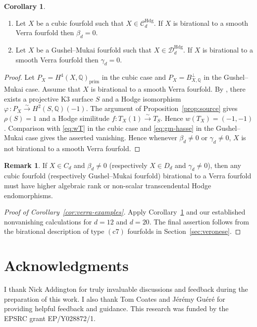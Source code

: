 \documentclass[10pt]{amsart}
\numberwithin{equation}{section}
\theoremstyle{definition}
\newtheorem{corollary}[theorem]{Corollary}
\newtheorem{remark}[theorem]{Remark}
\theoremstyle{plain}
\numberwithin{theorem}{section}
\newcommand{\Q}{\mathbb{Q}}
\begin{document}
\begin{corollary}\label{cor:verra} \ 
\begin{enumerate}
    \item Let $X$ be a cubic fourfold such that $X\in\mathcal C_d^{\mathrm{Hdg}}$. If $X$ is birational to a smooth Verra fourfold then $\beta_d = 0$.
    \item Let $X$ be a Gushel--Mukai fourfold such that $X\in\mathcal D_d^{\mathrm{Hdg}}$. If $X$ is birational to a smooth Verra fourfold then $\gamma_d = 0$.
\end{enumerate}
\end{corollary}
\begin{proof}
Let $P_X = H^4(X,\Q)_{\text{prim}}$ in the cubic case and $P_X = B_{X,\Q}^\perp$ in the Gushel--Mukai case. Assume that $X$ is birational to a smooth Verra fourfold. By \cite[Theorem~21]{benedetti2026quantumcohomologybirationalgeometry}, there exists a projective K3 surface $S$ and a Hodge isomorphism $\varphi\,\colon P_X\xrightarrow{\sim}H^2(S,\Q)(-1)$. The argument of Proposition~\ref{prop:source} gives $\rho(S)=1$ and a Hodge similitude $f\colon T_X(1)\xrightarrow{\sim}T_S$. Hence $w(T_X)=(-1,-1)$. Comparison with \eqref{eq:wT} in the cubic case and \eqref{eq:gm-hasse} in the Gushel--Mukai case gives the asserted
vanishing. Hence whenever $\beta_d \ne 0$ or $\gamma_d \ne 0$, $X$ is not birational to a smooth Verra fourfold.  
\end{proof}

\begin{remark}
If $X\in C_d$ and $\beta_d \ne 0$ (respectively $X\in D_d$ and $\gamma_d \ne 0$), then any cubic fourfold (respectively Gushel--Mukai fourfold) birational to
a Verra fourfold must have higher algebraic rank or non-scalar
transcendental Hodge endomorphisms.
\end{remark}

\begin{proof}[Proof of Corollary~\ref{cor:verra-examples}]
Apply Corollary~\ref{cor:verra} and our established nonvanishing calculations for
$d=12$ and $d=20$. The final assertion follows
from the birational description of type $(\mathrm{c7})$ fourfolds
in Section~\ref{sec:veronese}.
\end{proof}

\section{Acknowledgments}
I thank Nick Addington for truly invaluable discussions and feedback during the preparation of this work. I also thank Tom Coates and J\'{e}r\'{e}my Gu\'{e}r\'{e} for providing helpful feedback and guidance. This research was funded by the EPSRC grant EP/Y028872/1. 



\end{document}
